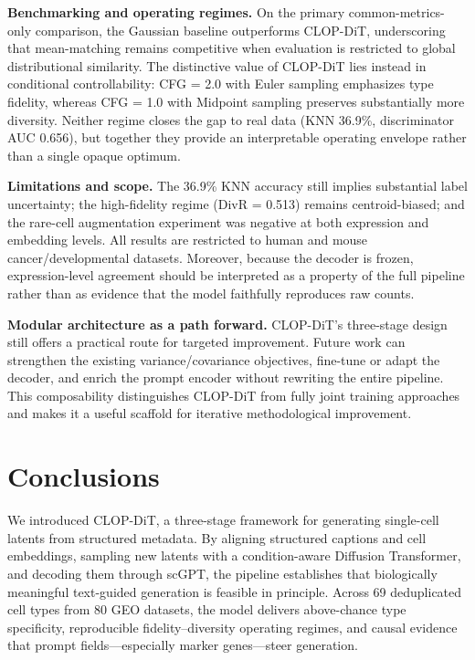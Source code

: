 \documentclass[fleqn,10pt,lineno]{wlpeerj}
\begin{document}
\textbf{Benchmarking and operating regimes.} On the primary common-metrics-only comparison, the Gaussian baseline outperforms CLOP-DiT, underscoring that mean-matching remains competitive when evaluation is restricted to global distributional similarity. The distinctive value of CLOP-DiT lies instead in conditional controllability: CFG = 2.0 with Euler sampling emphasizes type fidelity, whereas CFG = 1.0 with Midpoint sampling preserves substantially more diversity. Neither regime closes the gap to real data (KNN 36.9\%, discriminator AUC 0.656), but together they provide an interpretable operating envelope rather than a single opaque optimum.

\textbf{Limitations and scope.} The 36.9\% KNN accuracy still implies substantial label uncertainty; the high-fidelity regime (DivR = 0.513) remains centroid-biased; and the rare-cell augmentation experiment was negative at both expression and embedding levels. All results are restricted to human and mouse cancer/developmental datasets. Moreover, because the decoder is frozen, expression-level agreement should be interpreted as a property of the full pipeline rather than as evidence that the model faithfully reproduces raw counts.

\textbf{Modular architecture as a path forward.} CLOP-DiT's three-stage design still offers a practical route for targeted improvement. Future work can strengthen the existing variance/covariance objectives, fine-tune or adapt the decoder, and enrich the prompt encoder without rewriting the entire pipeline. This composability distinguishes CLOP-DiT from fully joint training approaches~\citep{ref-scdesign3} and makes it a useful scaffold for iterative methodological improvement.

\section*{Conclusions}\label{sec:conclusions}

We introduced CLOP-DiT, a three-stage framework for generating single-cell latents from structured metadata. By aligning structured captions and cell embeddings, sampling new latents with a condition-aware Diffusion Transformer, and decoding them through scGPT, the pipeline establishes that biologically meaningful text-guided generation is feasible in principle. Across 69 deduplicated cell types from 80 GEO datasets, the model delivers above-chance type specificity, reproducible fidelity--diversity operating regimes, and causal evidence that prompt fields---especially marker genes---steer generation.
\end{document}
